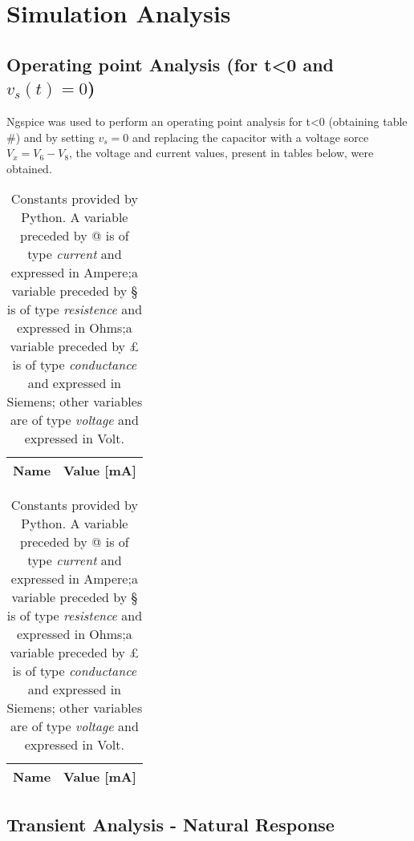 \section{Simulation Analysis}
\label{sec:simulation}

\subsection{Operating point Analysis (for t<0 and $v_s(t) = 0$)}

Ngspice was used to perform an operating point analysis for t<0 (obtaining table #) and by setting $v_s = 0$ and replacing the capacitor with a voltage sorce $V_x = V_6 - V_8$, the voltage and current values, present in tables below, were obtained.

\begin{table}[!h]
	\centering
	\begin{tabular}{|l|r|}
		\hline    
		{\bf Name} & {\bf Value [mA]} \\ \hline
		
	\end{tabular}
	\caption{Constants provided by Python. A variable preceded by @ is of type {\em current}
		and expressed in Ampere;a variable preceded by § is of type {\it resistence} and expressed in
		Ohms;a variable preceded by £ is of type {\it conductance} and expressed in
		Siemens; other variables are of type {\it voltage} and expressed in
		Volt.}
	\label{tab:op}
\end{table}



\begin{table}[!h]
	\centering
	\begin{tabular}{|l|r|}
		\hline    
		{\bf Name} & {\bf Value [mA]} \\ \hline
		
	\end{tabular}
	\caption{Constants provided by Python. A variable preceded by @ is of type {\em current}
		and expressed in Ampere;a variable preceded by § is of type {\it resistence} and expressed in
		Ohms;a variable preceded by £ is of type {\it conductance} and expressed in
		Siemens; other variables are of type {\it voltage} and expressed in
		Volt.}
	\label{tab:op}
\end{table}


\subsection{Transient Analysis - Natural Response}

